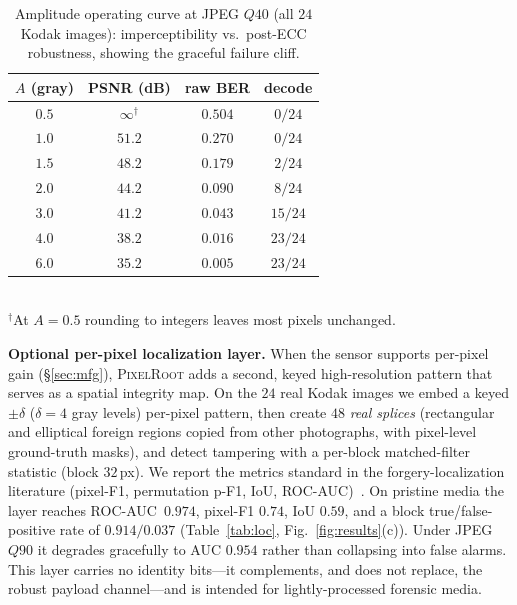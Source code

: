 \documentclass[journal]{IEEEtran}
\newcommand{\pr}{\textup{\textsc{PixelRoot}}}
\begin{document}
\ifshort\else
\begin{table}[t]
\centering
\caption{Amplitude operating curve at JPEG $Q40$ (all $24$ Kodak images):
imperceptibility vs.\ post-ECC robustness, showing the graceful failure cliff.}
\label{tab:sweep}
\renewcommand{\arraystretch}{1.15}
\setlength{\tabcolsep}{6pt}
\footnotesize
\begin{tabular}{@{}cccc@{}}
\toprule
\textbf{$A$ (gray)} & \textbf{PSNR (dB)} & \textbf{raw BER} & \textbf{decode} \\
\midrule
$0.5$ & $\infty^{\dagger}$ & $0.504$ & $0/24$ \\
$1.0$ & $51.2$ & $0.270$ & $0/24$ \\
$1.5$ & $48.2$ & $0.179$ & $2/24$ \\
$2.0$ & $44.2$ & $0.090$ & $8/24$ \\
$3.0$ & $41.2$ & $0.043$ & $15/24$ \\
$4.0$ & $38.2$ & $0.016$ & $23/24$ \\
$6.0$ & $35.2$ & $0.005$ & $23/24$ \\
\bottomrule
\end{tabular}
\\[2pt]
{\footnotesize $^\dagger$At $A\!=\!0.5$ rounding to integers leaves most pixels unchanged.}
\end{table}
\fi

\ifshort
\else
\noindent\textbf{Optional per-pixel localization layer.} When the sensor
supports per-pixel gain (\S\ref{sec:mfg}), \pr{} adds a second, keyed
high-resolution pattern that serves as a spatial integrity map. On the $24$ real
Kodak images we embed a keyed $\pm\delta$ ($\delta\!=\!4$ gray levels) per-pixel
pattern, then create $48$ \emph{real splices} (rectangular and elliptical foreign
regions copied from other photographs, with pixel-level ground-truth masks), and
detect tampering with a per-block matched-filter statistic (block $32$\,px). We
report the metrics standard in the forgery-localization literature
(pixel-F1, permutation p-F1, IoU, ROC-AUC)~\cite{imd2020,casia}. On pristine
media the layer reaches \mbox{ROC-AUC $0.974$}, pixel-F1 $0.74$, IoU $0.59$, and a
block true/false-positive rate of $0.914/0.037$ (Table~\ref{tab:loc},
Fig.~\ref{fig:results}(c)). Under JPEG~$Q90$ it degrades gracefully to AUC
$0.954$ rather than collapsing into false alarms. This layer carries no identity
bits---it complements, and does not replace, the robust payload channel---and is
intended for lightly-processed forensic media.
\end{document}
